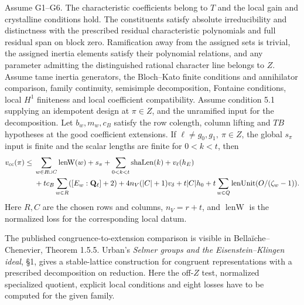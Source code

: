 \begin{formalstatement}\label{pn:P044}
Assume G1--G6. The characteristic coefficients belong to \(T\) and the local gain and crystalline conditions hold. The constituents satisfy absolute irreducibility and distinctness with the prescribed residual characteristic polynomials and full residual span on block zero. Ramification away from the assigned sets is trivial, the assigned inertia elements satisfy their polynomial relations, and any parameter admitting the distinguished rational character line belongs to \(Z\). Assume tame inertia generators, the Bloch--Kato finite conditions and annihilator comparison, family continuity, semisimple decomposition, Fontaine conditions, local \(H^1\) finiteness and local coefficient compatibility. Assume condition 5.1 supplying an idempotent design at \(\pi\in Z\), and the unramified input for the decomposition. Let \(b_w,m_w,c_B\) satisfy the row colength, column lifting and \(TB\) hypotheses at the good coefficient extensions. If \(\ell\ne g_0,g_1,\ \pi\in Z\), the global \(s_\pi\) input is finite and the scalar lengths are finite for \(0<k<t\), then
\[
\begin{aligned}
v_{\rm cc}(\pi)\le{}&
 \sum_{w\in R\cup C}\operatorname{lenW}(w)+s_\pi+
 \sum_{0<k<t}\operatorname{shaLen}(k)+v_\ell(h_E)\\
 &+t c_B\sum_{w\in R}([E_w:\mathbf Q_\ell]+2)
 +4 n_V(|C|+1)v_\delta+t|C|h_0
 +t\sum_{w\in Q}\operatorname{lenUnit}(O/(\zeta_w-1)).
\end{aligned}
\]
Here \(R,C\) are the chosen rows and columns, \(n_V=r+t\), and \(\operatorname{lenW}\) is the normalized loss for the corresponding local datum.
\end{formalstatement}
The published congruence-to-extension comparison is visible in Bellaïche--Chenevier, Theorem 1.5.5. Urban's \emph{Selmer groups and the Eisenstein--Klingen ideal}, \S1, gives a stable-lattice construction for congruent representations with a prescribed decomposition on reduction. Here the off-\(Z\) test, normalized specialized quotient, explicit local conditions and eight losses have to be computed for the given family.
